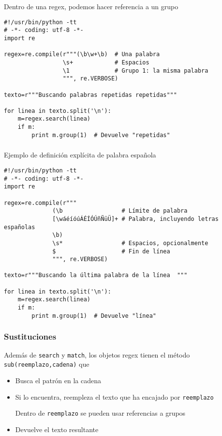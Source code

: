 \documentclass[ucs]{beamer}
\begin{document}
\begin{frame}[fragile]
Dentro de una regex, podemos hacer referencia a un grupo

  \begin{footnotesize}
  \begin{verbatim}
#!/usr/bin/python -tt
# -*- coding: utf-8 -*-
import re

regex=re.compile(r"""(\b\w+\b)  # Una palabra 
                 \s+            # Espacios
                 \1             # Grupo 1: la misma palabra
                 """, re.VERBOSE)

texto=r"""Buscando palabras repetidas repetidas"""

for linea in texto.split('\n'):
    m=regex.search(linea)
    if m:
        print m.group(1)  # Devuelve "repetidas"
  \end{verbatim}
  \end{footnotesize}

\end{frame}



\begin{frame}[fragile]
\frametitle{}
Ejemplo de definición explícita de palabra española

  \begin{scriptsize}
  \begin{verbatim}
#!/usr/bin/python -tt
# -*- coding: utf-8 -*-
import re

regex=re.compile(r"""
              (\b                 # Límite de palabra
              [\wáéíóúÁÉÍÓÚñÑüÜ]+ # Palabra, incluyendo letras españolas
              \b)    
              \s*                 # Espacios, opcionalmente
              $                   # Fin de línea
              """, re.VERBOSE)

texto=r"""Buscando la última palabra de la línea  """

for linea in texto.split('\n'):
    m=regex.search(linea)
    if m:
        print m.group(1)  # Devuelve "línea"
  \end{verbatim}
  \end{scriptsize}

\end{frame}

\begin{frame}[fragile]
\frametitle{Sustituciones}
Además de \verb|search| y \verb|match|, 
los objetos regex 
tienen el método 
\verb|sub(reemplazo,cadena)| que
\begin{itemize}
\item
Busca el patrón en la cadena
\item
Si lo encuentra, reempleza el texto que ha encajado
por \verb|reemplazo|

Dentro de \verb|reemplazo| se pueden usar referencias
a grupos 
\item
Devuelve el texto resultante
\end{itemize}

\end{frame}
\end{document}
